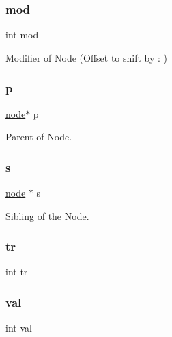 \hypertarget{structnode_ext_a9a72f3dcc6f4a19af79744c85a319f32}{}\label{structnode_ext_a9a72f3dcc6f4a19af79744c85a319f32} 
\subsubsection{\texorpdfstring{mod}{mod}}
{\footnotesize\ttfamily int mod}



Modifier of Node (Offset to shift by \+: ) 

\hypertarget{structnode_ext_aa2a7d0665dce0c3fa1ecca4d1ebbce5c}{}\label{structnode_ext_aa2a7d0665dce0c3fa1ecca4d1ebbce5c} 
\subsubsection{\texorpdfstring{p}{p}}
{\footnotesize\ttfamily \hyperlink{binary_tree_w_s_8h_aafd781b4673cf2585cd9a156aebd08de}{node}$\ast$ p}



Parent of Node. 

\hypertarget{structnode_ext_aa51f6e5e2586b1bc1bcc7204c69a8e10}{}\label{structnode_ext_aa51f6e5e2586b1bc1bcc7204c69a8e10} 
\subsubsection{\texorpdfstring{s}{s}}
{\footnotesize\ttfamily \hyperlink{binary_tree_w_s_8h_aafd781b4673cf2585cd9a156aebd08de}{node} $\ast$ s}



Sibling of the Node. 

\hypertarget{structnode_ext_aff41eaae2f593991bf076116299bd514}{}\label{structnode_ext_aff41eaae2f593991bf076116299bd514} 
\subsubsection{\texorpdfstring{tr}{tr}}
{\footnotesize\ttfamily int tr}

\hypertarget{structnode_ext_aa0ccb5ee6d882ee3605ff47745c6467b}{}\label{structnode_ext_aa0ccb5ee6d882ee3605ff47745c6467b} 
\subsubsection{\texorpdfstring{val}{val}}
{\footnotesize\ttfamily int val}




